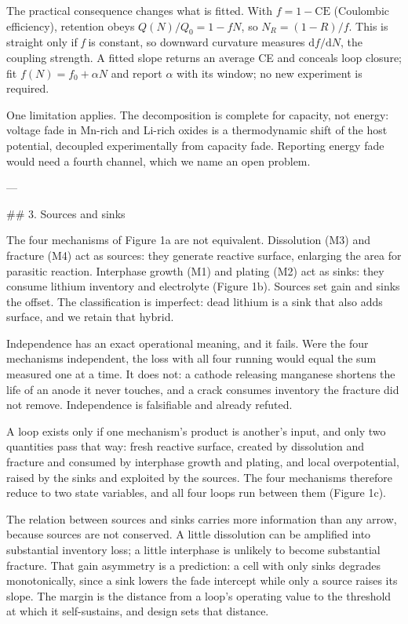 The practical consequence changes what is fitted. With $f = 1 - \mathrm{CE}$ (Coulombic efficiency), retention obeys $Q(N)/Q_0 = 1 - fN$, so $N_R = (1 - R)/f$. This is straight only if \emph{f} is constant, so downward curvature measures $\mathrm{d}f/\mathrm{d}N$, the coupling strength. A fitted slope returns an average CE and conceals loop closure;\cite{smith2010precision} fit $f(N) = f_0 + \alpha N$ and report $\alpha$ with its window; no new experiment is required.

One limitation applies. The decomposition is complete for capacity, not energy: voltage fade in Mn-rich and Li-rich oxides is a thermodynamic shift of the host potential, decoupled experimentally from capacity fade.\cite{pang2025resolving} Reporting energy fade would need a fourth channel, which we name an open problem.

---

## 3. Sources and sinks

The four mechanisms of Figure 1a are not equivalent. Dissolution (M3) and fracture (M4) act as sources: they generate reactive surface, enlarging the area for parasitic reaction.\cite{single2018identifying} Interphase growth (M1) and plating (M2) act as sinks: they consume lithium inventory and electrolyte (Figure 1b).\cite{nojabaee2021understanding,brown2021detecting} Sources set gain and sinks the offset. The classification is imperfect: dead lithium is a sink that also adds surface, and we retain that hybrid.

Independence has an exact operational meaning, and it fails. Were the four mechanisms independent, the loss with all four running would equal the sum measured one at a time. It does not: a cathode releasing manganese shortens the life of an anode it never touches, and a crack consumes inventory the fracture did not remove.\cite{santos2023chemistry} Independence is falsifiable and already refuted.

A loop exists only if one mechanism's product is another's input, and only two quantities pass that way: fresh reactive surface, created by dissolution and fracture and consumed by interphase growth and plating, and local overpotential, raised by the sinks and exploited by the sources. The four mechanisms therefore reduce to two state variables, and all four loops run between them (Figure 1c).

The relation between sources and sinks carries more information than any arrow, because sources are not conserved. A little dissolution can be amplified into substantial inventory loss; a little interphase is unlikely to become substantial fracture. That gain asymmetry is a prediction: a cell with only sinks degrades monotonically, since a sink lowers the fade intercept while only a source raises its slope. The margin is the distance from a loop's operating value to the threshold at which it self-sustains, and design sets that distance.

